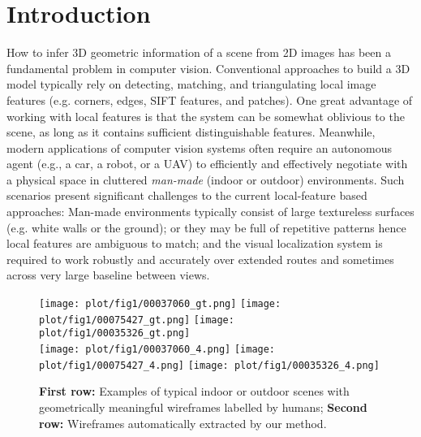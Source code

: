 \documentclass[10pt,twocolumn,letterpaper]{article}
\newcommand{\nop}[1]{}
\begin{document}
\section{Introduction}
How to infer 3D geometric information of a scene from 2D images has been a fundamental problem in computer vision. Conventional approaches to build a 3D model typically rely on detecting, matching, and triangulating local image features (e.g. corners, edges, SIFT features, and patches). One great advantage of working with local features is that the system can be somewhat oblivious to the scene, as long as it contains sufficient distinguishable features. Meanwhile, modern applications of computer vision systems often require an autonomous agent (e.g., a car, a robot, or a UAV) to efficiently and effectively negotiate with a physical space in cluttered {\em man-made} (indoor or outdoor) environments. Such scenarios present significant challenges to the current local-feature based approaches: Man-made environments typically consist of large textureless surfaces (e.g. white walls or the ground); or they may be full of repetitive patterns hence local features are ambiguous to match; and the visual localization system is required to work robustly and accurately over extended routes and sometimes across very large baseline between views. 

\nop{
\begin{figure}[t]
\centering
\texttt{[image: plot/teaser1.png]}\vspace{-2mm}
\caption{ \vspace{-5mm}}
\label{fig:teaser}
\end{figure}
}

\begin{figure}
\centering
\texttt{[image: plot/fig1/00037060\_gt.png]}
\texttt{[image: plot/fig1/00075427\_gt.png]}
\texttt{[image: plot/fig1/00035326\_gt.png]}\\
\vspace{0.5mm}\texttt{[image: plot/fig1/00037060\_4.png]}
\texttt{[image: plot/fig1/00075427\_4.png]}
\texttt{[image: plot/fig1/00035326\_4.png]}\\
\caption{{\bf First row:} Examples of typical indoor or outdoor scenes with geometrically meaningful wireframes labelled by humans; {\bf Second row:} Wireframes automatically extracted by our method.}
\vspace{-3mm}
\label{fig:teaser}
\end{figure}
\end{document}
